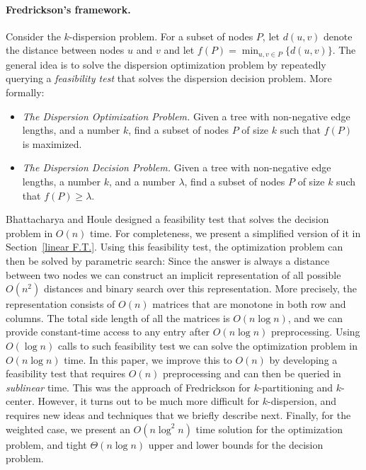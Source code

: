 \documentclass[11pt,a4paper]{article}
\newcommand{\Oh}{{O}}
\theoremstyle{definition}
\theoremstyle{remark}
\begin{document}
\vspace{-0.1in}
\paragraph{Fredrickson's framework.}
Consider the $k$-dispersion problem. For a subset of nodes $P$, let $d(u,v)$ denote the distance between nodes $u$ and $v$ and let $f(P)=\min_{u,v\in P} \{d(u,v)\}$. The general idea is to solve the dispersion optimization problem by repeatedly querying a {\em feasibility test} that solves the dispersion decision problem. More formally: 


\begin{itemize} 
\item {\em The Dispersion Optimization Problem.} Given a tree with non-negative edge lengths, and a  number $k$, find a subset of nodes $P$ of size $k$  such that  $f(P)$ is maximized. 

\item  {\em The Dispersion Decision Problem.}  Given a tree with non-negative edge lengths, a number $k$, and a number $\lambda$, find a subset of nodes  $P$ of size $k$ such that  $f(P)\geq\lambda$. 
\end{itemize}

Bhattacharya and Houle designed a feasibility test that solves the decision problem in $\Oh(n)$ time. For completeness, we present a simplified version of it in Section~\ref{linear F.T.}.
Using this feasibility test, the optimization problem can then be solved by parametric search: Since the answer is always
a distance between two nodes we can construct an implicit representation of all possible $O(n^{2})$ distances and binary search over this representation. More precisely, the representation consists of $O(n)$ matrices that are monotone in both row and columns. The total side length
of all the matrices is $O(n\log n)$, and we can provide constant-time access to any entry after $O(n\log n)$ preprocessing. Using $O(\log n)$ calls to such feasibility test we can solve the optimization problem in $O(n\log n)$ time. In this paper, we improve this to $O(n)$ by developing a feasibility test that requires $O(n)$ preprocessing and can then be queried in \emph{sublinear} time. This was the approach of Fredrickson for $k$-partitioning and $k$-center. However, it turns out to be much more difficult for $k$-dispersion, and requires new ideas and techniques that we briefly describe next. Finally, for the weighted case, we present an $\Oh(n\log^2n)$ time solution for the optimization problem, and tight $\Theta(n\log n)$ upper and lower bounds for the decision problem. 
\end{document}

